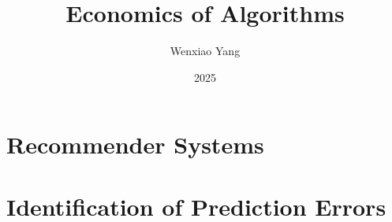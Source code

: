 \documentclass[11pt]{elegantbook}
\title{Economics of Algorithms}
\author{Wenxiao Yang}
\institute{Haas School of Business, University of California Berkeley}
\date{2025}
\begin{document}
\maketitle

\frontmatter
\tableofcontents

\mainmatter


\chapter{Recommender Systems}






\chapter{Identification of Prediction Errors}
















\end{document}
